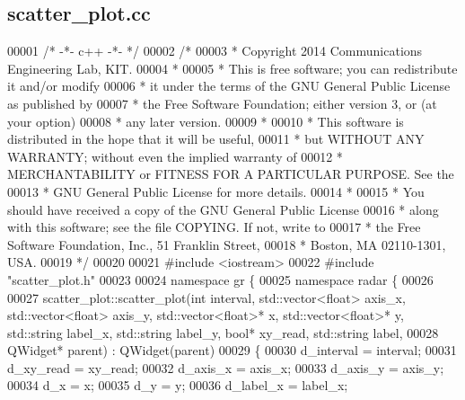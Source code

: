 \subsection{scatter\+\_\+plot.\+cc}
\label{scatter__plot_8cc_source}

\begin{DoxyCode}
00001 \textcolor{comment}{/* -*- c++ -*- */}
00002 \textcolor{comment}{/* }
00003 \textcolor{comment}{ * Copyright 2014 Communications Engineering Lab, KIT.}
00004 \textcolor{comment}{ * }
00005 \textcolor{comment}{ * This is free software; you can redistribute it and/or modify}
00006 \textcolor{comment}{ * it under the terms of the GNU General Public License as published by}
00007 \textcolor{comment}{ * the Free Software Foundation; either version 3, or (at your option)}
00008 \textcolor{comment}{ * any later version.}
00009 \textcolor{comment}{ * }
00010 \textcolor{comment}{ * This software is distributed in the hope that it will be useful,}
00011 \textcolor{comment}{ * but WITHOUT ANY WARRANTY; without even the implied warranty of}
00012 \textcolor{comment}{ * MERCHANTABILITY or FITNESS FOR A PARTICULAR PURPOSE.  See the}
00013 \textcolor{comment}{ * GNU General Public License for more details.}
00014 \textcolor{comment}{ * }
00015 \textcolor{comment}{ * You should have received a copy of the GNU General Public License}
00016 \textcolor{comment}{ * along with this software; see the file COPYING.  If not, write to}
00017 \textcolor{comment}{ * the Free Software Foundation, Inc., 51 Franklin Street,}
00018 \textcolor{comment}{ * Boston, MA 02110-1301, USA.}
00019 \textcolor{comment}{ */}
00020 
00021 \textcolor{preprocessor}{#include <iostream>}
00022 \textcolor{preprocessor}{#include "scatter_plot.h"}
00023 
00024 \textcolor{keyword}{namespace }gr \{
00025     \textcolor{keyword}{namespace }radar \{
00026 
00027         scatter_plot::scatter_plot(\textcolor{keywordtype}{int} interval, std::vector<float> axis\_x, std::vector<float> axis\_y, 
      std::vector<float>* x, std::vector<float>* y, std::string label\_x, std::string label\_y, \textcolor{keywordtype}{bool}* xy\_read, 
      std::string label,
00028         QWidget* parent) : QWidget(parent)
00029         \{
00030             d_interval = interval;
00031             d_xy_read = xy\_read;
00032             d_axis_x = axis\_x;
00033             d_axis_y = axis\_y;
00034             d_x = x;
00035             d_y = y;
00036             d_label_x = label\_x;

\end{DoxyCode}
